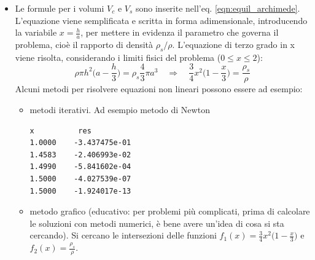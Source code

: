 \begin{itemize}
  \item Le formule per i volumi $V_c$ e $V_s$ sono inserite nell'eq.
   \ref{eqn:equil_archimede}. L'equazione viene semplificata e scritta in forma adimensionale, introducendo la variabile $x=\frac{h}{a}$, per mettere in evidenza il parametro che governa il problema, cioè il rapporto di densità $\rho_s/\rho$. L'equazione di terzo grado in x viene risolta, considerando i limiti fisici del problema ($0 \le x \le 2$):
    \begin{equation}
      \rho \pi h^2 \Big(a-\frac{h}{3}\Big) = \rho_s \frac{4}{3}\pi a^3  \quad\Rightarrow\quad
      \frac{3}{4} x^2 \Big(1 - \frac{x}{3}\Big) = \frac{\rho_s}{\rho}
    \end{equation}
  Alcuni metodi per risolvere equazioni non lineari possono essere ad esempio:
  \begin{itemize}
    \item metodi iterativi. Ad esempio metodo di Newton
    \begin{center}
\begin{verbatim}
x          res 
1.0000    -3.437475e-01  
1.4583    -2.406993e-02  
1.4990    -5.841602e-04  
1.5000    -4.027539e-07  
1.5000    -1.924017e-13
\end{verbatim}
\end{center}
    
    \item metodo grafico (educativo: per problemi più complicati, prima di calcolare le soluzioni con metodi
    numerici, è bene avere un'idea di cosa si sta cercando).
    Si cercano le intersezioni delle funzioni $f_1(x) = \frac{3}{4} x^2 \Big(1 - \frac{x}{3}\Big)$ e $f_2(x) = \frac{\rho_s}{\rho}$.
  
\begin{center}
\end{center}
    
  \end{itemize}
  
\end{itemize}

